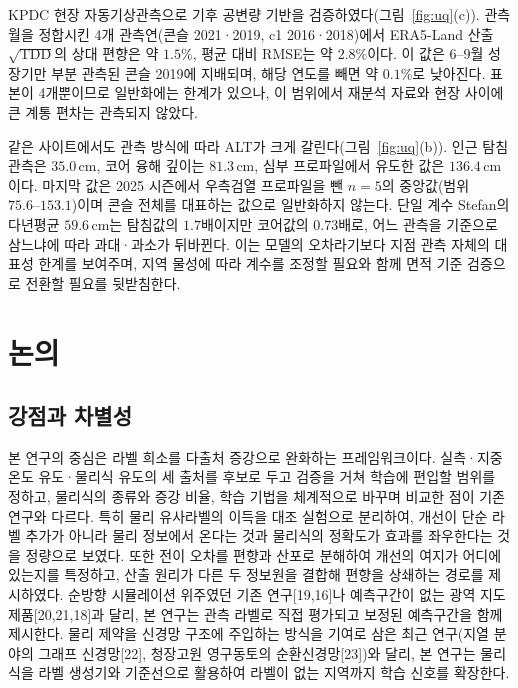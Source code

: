 \documentclass[10pt,twocolumn]{article}
\begin{document}
KPDC 현장 자동기상관측으로 기후 공변량 기반을 검증하였다(그림~\ref{fig:uq}(c)). 관측월을 정합시킨 4개 관측연(콘슬 2021·2019, c1 2016·2018)에서 ERA5-Land 산출 $\sqrt{\mathrm{TDD}}$의 상대 편향은 약 $1.5\%$, 평균 대비 RMSE는 약 $2.8\%$이다. 이 값은 6--9월 성장기만 부분 관측된 콘슬 2019에 지배되며, 해당 연도를 빼면 약 $0.1\%$로 낮아진다. 표본이 4개뿐이므로 일반화에는 한계가 있으나, 이 범위에서 재분석 자료와 현장 사이에 큰 계통 편차는 관측되지 않았다.


같은 사이트에서도 관측 방식에 따라 ALT가 크게 갈린다(그림~\ref{fig:uq}(b)). 인근 탐침 관측은 $35.0\,\mathrm{cm}$, 코어 융해 깊이는 $81.3\,\mathrm{cm}$, 심부 프로파일에서 유도한 값은 $136.4\,\mathrm{cm}$이다. 마지막 값은 2025 시즌에서 우측검열 프로파일을 뺀 $n{=}5$의 중앙값(범위 $75.6\text{--}153.1$)이며 콘슬 전체를 대표하는 값으로 일반화하지 않는다. 단일 계수 Stefan의 다년평균 $59.6\,\mathrm{cm}$는 탐침값의 $1.7$배이지만 코어값의 $0.73$배로, 어느 관측을 기준으로 삼느냐에 따라 과대·과소가 뒤바뀐다. 이는 모델의 오차라기보다 지점 관측 자체의 대표성 한계를 보여주며, 지역 물성에 따라 계수를 조정할 필요와 함께 면적 기준 검증으로 전환할 필요를 뒷받침한다.


\section{논의}

\subsection{강점과 차별성}
본 연구의 중심은 라벨 희소를 다출처 증강으로 완화하는 프레임워크이다. 실측·지중온도 유도·물리식 유도의 세 출처를 후보로 두고 검증을 거쳐 학습에 편입할 범위를 정하고, 물리식의 종류와 증강 비율, 학습 기법을 체계적으로 바꾸며 비교한 점이 기존 연구와 다르다. 특히 물리 유사라벨의 이득을 대조 실험으로 분리하여, 개선이 단순 라벨 추가가 아니라 물리 정보에서 온다는 것과 물리식의 정확도가 효과를 좌우한다는 것을 정량으로 보였다. 또한 전이 오차를 편향과 산포로 분해하여 개선의 여지가 어디에 있는지를 특정하고, 산출 원리가 다른 두 정보원을 결합해 편향을 상쇄하는 경로를 제시하였다. 순방향 시뮬레이션 위주였던 기존 연구[19,16]나 예측구간이 없는 광역 지도 제품[20,21,18]과 달리, 본 연구는 관측 라벨로 직접 평가되고 보정된 예측구간을 함께 제시한다. 물리 제약을 신경망 구조에 주입하는 방식을 기여로 삼은 최근 연구(지열 분야의 그래프 신경망[22], 청장고원 영구동토의 순환신경망[23])와 달리, 본 연구는 물리식을 라벨 생성기와 기준선으로 활용하여 라벨이 없는 지역까지 학습 신호를 확장한다.
\end{document}
